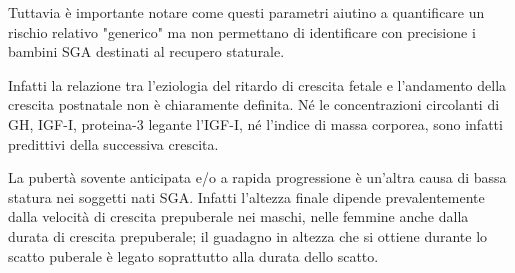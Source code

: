 Tuttavia è importante notare come questi parametri aiutino a quantificare un 
rischio relativo "generico" ma non permettano di identificare con precisione 
i bambini SGA destinati al recupero staturale.

Infatti la relazione tra l'eziologia del ritardo di crescita fetale e l'andamento della 
crescita postnatale non è chiaramente definita.
Né le concentrazioni circolanti di GH, IGF-I, proteina-3 legante l'IGF-I, n\'e l'indice
di massa corporea, sono infatti predittivi della successiva crescita.\cite{consensus}

La pubertà sovente anticipata e/o a rapida progressione è un'altra causa di bassa statura nei soggetti nati SGA. Infatti l'altezza finale dipende prevalentemente dalla velocità di crescita prepuberale nei maschi, nelle femmine anche dalla durata di crescita prepuberale; il guadagno in altezza che si ottiene durante lo scatto puberale è legato soprattutto alla durata dello scatto\cite{gasser1985human}.

